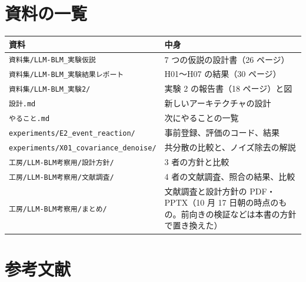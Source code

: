 \documentclass[xelatex,ja=standard,jafont=haranoaji,a4paper,10pt]{bxjsreport}
\newcommand{\code}[1]{\texttt{#1}}
\begin{document}
\chapter{資料の一覧}\label{app:docs}

\begin{longtable}{p{6.4cm}p{7.6cm}}
\toprule
\textbf{資料} & \textbf{中身} \\
\midrule
\endfirsthead
\bottomrule
\endfoot
\code{資料集/LLM-BLM\_実験仮説} & 7 つの仮説の設計書（26 ページ） \\
\code{資料集/LLM-BLM\_実験結果レポート} & H01〜H07 の結果（30 ページ） \\
\code{資料集/LLM-BLM\_実験2/} & 実験 2 の報告書（18 ページ）と図 \\
\code{設計.md} & 新しいアーキテクチャの設計 \\
\code{やること.md} & 次にやることの一覧 \\
\code{experiments/E2\_event\_reaction/} & 事前登録、評価のコード、結果 \\
\code{experiments/X01\_covariance\_denoise/} & 共分散の比較と、ノイズ除去の解説 \\
\code{工房/LLM-BLM考察用/設計方針/} & 3 者の方針と比較 \\
\code{工房/LLM-BLM考察用/文献調査/} & 4 者の文献調査、照合の結果、比較 \\
\code{工房/LLM-BLM考察用/まとめ/} & 文献調査と設計方針の PDF・PPTX（10 月 17 日朝の時点のもの。前向きの検証などは本書の方針で置き換えた） \\
\end{longtable}

\chapter*{参考文献}
\end{document}
